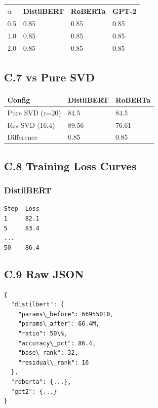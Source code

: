 \begin{table}[H]
\centering
\small
\begin{tabular}{llll}
\toprule
\textbf{$\alpha$} & \textbf{DistilBERT} & \textbf{RoBERTa} & \textbf{GPT-2} \\
\midrule
0.5 & 0.85 & 0.85 & 0.85 \\
1.0 & 0.85 & 0.85 & 0.85 \\
2.0 & 0.85 & 0.85 & 0.85 \\
\bottomrule
\end{tabular}
\end{table}

\subsection{C.7 vs Pure SVD}

\begin{table}[H]
\centering
\small
\begin{tabular}{lll}
\toprule
\textbf{Config} & \textbf{DistilBERT} & \textbf{RoBERTa} \\
\midrule
Pure SVD (r=20) & 84.5 & 84.5 \\
Res-SVD (16,4) & 89.56 & 76.61 \\
Difference & 0.85 & 0.85 \\
\bottomrule
\end{tabular}
\end{table}

\subsection{C.8 Training Loss Curves}

\subsubsection{DistilBERT}
\begin{lstlisting}
Step  Loss
1     82.1
5     83.4
...
50    86.4
\end{lstlisting}

\subsection{C.9 Raw JSON}

\begin{lstlisting}
{
  "distilbert": {
    "params\_before": 66955010,
    "params\_after": 66.4M,
    "ratio": 50\%,
    "accuracy\_pct": 86.4,
    "base\_rank": 32,
    "residual\_rank": 16
  },
  "roberta": {...},
  "gpt2": {...}
}
\end{lstlisting}

